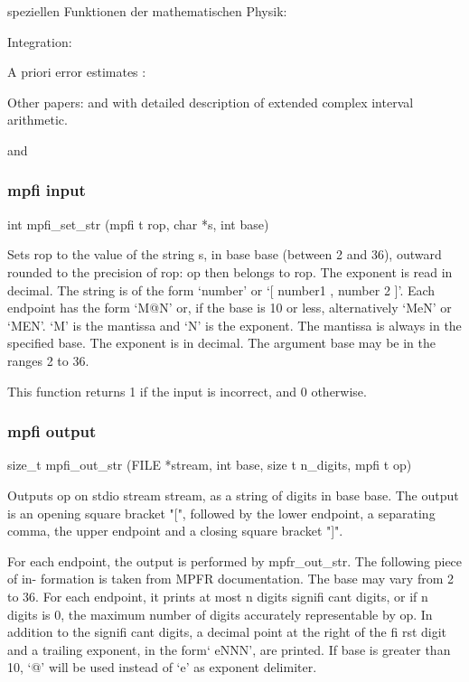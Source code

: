 speziellen Funktionen der mathematischen Physik: \cite{Hofschuster2000}

Integration: \cite{Wedner2000}


A priori error estimates : \cite{Blomquist2005}

Other papers:    \cite{Blomquist2008a} and  \cite{Blomquist2008} with detailed description of extended complex interval arithmetic.

and   \cite{Kramer2012}





\subsubsection{mpfi input}
int mpfi\_set\_str (mpfi t rop, char *s, int base)

Sets rop to the value of the string s, in base base (between 2 and 36), outward rounded to
the precision of rop: op then belongs to rop. The exponent is read in decimal. The string
is of the form ‘number’ or ‘[ number1 , number 2 ]’. Each endpoint has the form ‘M@N’ or, if
the base is 10 or less, alternatively ‘MeN’ or ‘MEN’. ‘M’ is the mantissa and ‘N’ is the exponent.
The mantissa is always in the specified base. The exponent is in decimal. The argument base
may be in the ranges 2 to 36.

This function returns 1 if the input is incorrect, and 0 otherwise.




\subsubsection{mpfi output}
size\_t mpfi\_out\_str (FILE *stream, int base, size t n\_digits, mpfi t op)

Outputs op on stdio stream stream, as a string of digits in base base. The output is an
opening square bracket "[", followed by the lower endpoint, a separating comma, the upper
endpoint and a closing square bracket "]".

For each endpoint, the output is performed by mpfr\_out\_str. The following piece of in-
formation is taken from MPFR documentation. The base may vary from 2 to 36. For each
endpoint, it prints at most n digits signifi cant digits, or if n digits is 0, the maximum number
of digits accurately representable by op. In addition to the signifi cant digits, a decimal point
at the right of the fi rst digit and a trailing exponent, in the form‘ eNNN’, are printed. If base
is greater than 10, ‘@’ will be used instead of ‘e’ as exponent delimiter.

